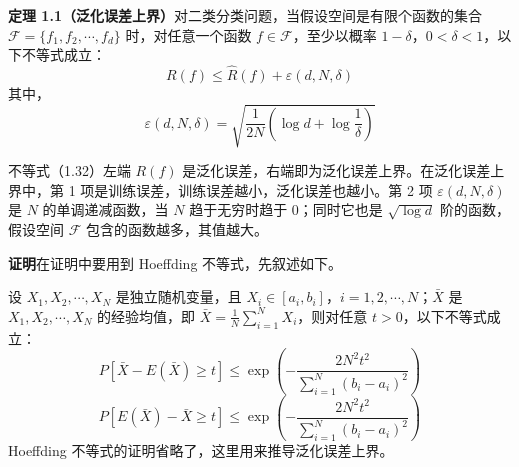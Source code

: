 \documentclass[UTF8,12pt,a4paper,fontset=fandol]{ctexart}
\begin{document}
\noindent\textbf{定理 1.1（泛化误差上界）}\quad 对二类分类问题，当假设空间是有限个函数的集合 $\mathcal F=\{f_1,f_2,\cdots,f_d\}$ 时，对任意一个函数 $f\in\mathcal F$，至少以概率 $1-\delta$，$0<\delta<1$，以下不等式成立：
\begin{equation}
  R(f)\le\hat R(f)+\varepsilon(d,N,\delta)
  \tag{1.32}
\end{equation}
其中，
\begin{equation}
  \varepsilon(d,N,\delta)=\sqrt{\frac1{2N}\left(\log d+\log\frac1\delta\right)}
  \tag{1.33}
\end{equation}

不等式（1.32）左端 $R(f)$ 是泛化误差，右端即为泛化误差上界。在泛化误差上界中，第 1 项是训练误差，训练误差越小，泛化误差也越小。第 2 项 $\varepsilon(d,N,\delta)$ 是 $N$ 的单调递减函数，当 $N$ 趋于无穷时趋于 0；同时它也是 $\sqrt{\log d}$ 阶的函数，假设空间 $\mathcal F$ 包含的函数越多，其值越大。

\noindent\textbf{证明}\quad 在证明中要用到 Hoeffding 不等式，先叙述如下。

设 $X_1,X_2,\cdots,X_N$ 是独立随机变量，且 $X_i\in[a_i,b_i]$，$i=1,2,\cdots,N$；$\bar X$ 是 $X_1,X_2,\cdots,X_N$ 的经验均值，即 $\bar X=\frac1N\sum_{i=1}^N X_i$，则对任意 $t>0$，以下不等式成立：
\begin{equation}
  P[\bar X-E(\bar X)\ge t]\le
  \exp\left(-\frac{2N^2t^2}{\sum_{i=1}^N(b_i-a_i)^2}\right)
  \tag{1.34}
\end{equation}
\begin{equation}
  P[E(\bar X)-\bar X\ge t]\le
  \exp\left(-\frac{2N^2t^2}{\sum_{i=1}^N(b_i-a_i)^2}\right)
  \tag{1.35}
\end{equation}
Hoeffding 不等式的证明省略了，这里用来推导泛化误差上界。
\end{document}
